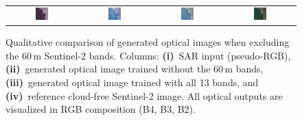 \begin{figure}[h!]
\begin{tabular}{cccc}
        \includegraphics[width=0.2\textwidth, height=0.2\textheight, keepaspectratio]{img/exclusion_60_m/bands10/sample_000065_sar_pseudo.png} &
        \includegraphics[width=0.2\textwidth, height=0.2\textheight, keepaspectratio]{img/exclusion_60_m/bands10/sample_000065_pred_rgb.png} &
        \includegraphics[width=0.2\textwidth, height=0.2\textheight, keepaspectratio]{img/exclusion_60_m/bands13/sample_000065_pred_rgb.png} &
        \includegraphics[width=0.2\textwidth, height=0.2\textheight, keepaspectratio]{img/exclusion_60_m/bands10/sample_000065_true_rgb.png} \\
    \end{tabular}

    \caption[Qualitative results when excluding 60\,m bands]{%
    Qualitative comparison of generated optical images when excluding the 60\,m Sentinel-2 bands. 
    Columns: \textbf{(i)}~SAR input (pseudo-RGB), 
    \textbf{(ii)}~generated optical image trained without the 60\,m bands, 
    \textbf{(iii)}~generated optical image trained with all 13 bands, and 
    \textbf{(iv)}~reference cloud-free Sentinel-2 image. 
    All optical outputs are visualized in RGB composition (B4, B3, B2).}
    \label{fig:ablation_excluding_60m_qualitative}
\end{figure}

